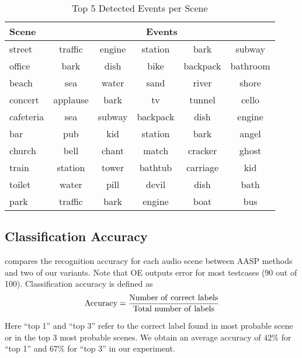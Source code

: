 \begin{table}[th]
\centering
\small
\caption{Top 5 Detected Events per Scene}
\label{tab:te}
\begin{tabular}{l|ccccc}
\toprule
{\bf Scene} & \multicolumn{5}{c}{{\bf Events}}\\
\hline
street & traffic & engine & station & bark & subway\\ \hline
office & bark & dish & bike & backpack & bathroom\\ \hline
beach & sea & water & sand & river & shore\\ \hline
concert & applause & bark & tv & tunnel & cello\\ \hline
cafeteria & sea & subway & backpack & dish & engine\\ \hline
bar & pub & kid & station & bark & angel\\ \hline
church & bell & chant & match & cracker & ghost\\ \hline
train & station & tower & bathtub & carriage & kid\\ \hline
toilet & water & pill & devil & dish & bath\\ \hline
park & traffic & bark & engine & boat & bus\\
\bottomrule
\end{tabular}
\end{table}

\subsection{Classification Accuracy}
 compares the recognition accuracy for each audio scene between
AASP methods and two of our variants.
Note that OE outputs error  for most testcases (90 out of 100).
Classification accuracy is defined as 
\[\rm{Accuracy} = \frac{\rm{Number~ of~ correct~ labels}}{\rm{Total~ number~ of~ labels}}\]

Here ``top 1'' and ``top 3'' refer to the correct label found in most probable
scene or in the top 3 most probable scenes.
We obtain an average accuracy of $42\%$ for ``top 1'' and $67\%$ for ``top 3''
in our experiment.

